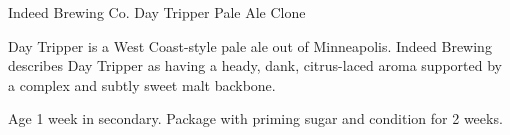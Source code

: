 \begin{recipie}{Indeed Brewing Co. Day Tripper Pale Ale Clone}

\begin{aboutblock}
Day Tripper is a West Coast-style pale ale out of Minneapolis. Indeed Brewing
describes Day Tripper as having a heady, dank, citrus-laced aroma supported by a
complex and subtly sweet malt backbone. \sourceaha
\end{aboutblock}


\begin{methodandtiming}
 
\begin{mashsteps}
\end{mashsteps}

\begin{fermentationsteps}
\end{fermentationsteps}

\begin{directions}
Age 1 week in secondary. Package with  priming sugar and condition
for 2 weeks.
\end{directions}

\end{methodandtiming}

\pagebreak

\begin{ingredientsblock}

\begin{malts}

\end{malts}

\begin{hops}
\end{hops}


\end{ingredientsblock}

\end{recipie}

